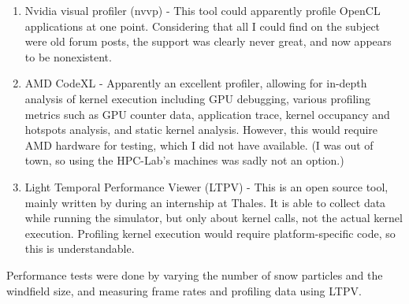 \begin{enumerate}
\item Nvidia visual profiler (nvvp) - This tool could apparently profile OpenCL applications at one point. Considering that all I could find on the subject were old forum posts, the support was clearly never great, and now appears to be nonexistent.
\item AMD CodeXL - Apparently an excellent profiler, allowing for in-depth analysis of kernel execution including GPU debugging, various profiling metrics such as GPU counter data, application trace, kernel occupancy and hotspots analysis, and static kernel analysis. However, this would require AMD hardware for testing, which I did not have available. (I was out of town, so using the HPC-Lab's machines was sadly not an option.)
\item Light Temporal Performance Viewer (LTPV) - This is an open source tool, mainly written by \citet{denel2013ltpv} during an internship at Thales. It is able to collect data while running the simulator, but only about kernel calls, not the actual kernel execution. Profiling kernel execution would require platform-specific code, so this is understandable.
\end{enumerate}

Performance tests were done by varying the number of snow particles and the windfield size, and measuring frame rates and profiling data using LTPV.

